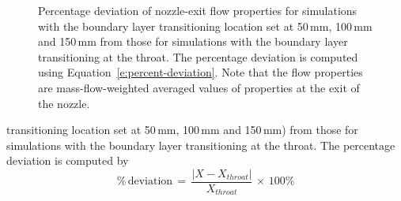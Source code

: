 \documentclass[12pt,a4paper]{article}
\begin{document}
\begin{figure}[htbp]
\begin{center}
{   \label{f:nozzle-exit-x-vel-quantify-effects-BL-trans}
  }
  \quad
  \caption{Percentage deviation of nozzle-exit flow properties for simulations 
           with the boundary layer transitioning location set at 50\,mm, 100\,mm 
           and 150\,mm from those for simulations with the boundary layer 
           transitioning at the throat. The percentage deviation is computed using
           Equation~\ref{e:percent-deviation}. Note that the flow properties are 
           mass-flow-weighted averaged values of properties at the exit of the nozzle.}
  \label{f:nozzle-exit-profiles-quantify-effects-BL-trans}
 \end{center}
\end{figure}
%
transitioning location set at 50\,mm, 100\,mm and 150\,mm) from those for simulations 
with the boundary layer transitioning at the throat. The percentage deviation is 
computed by 
%
\begin{equation}
 \% \, \mathrm{deviation} \, = \, \frac{|X - X_{throat}|}{X_{throat}} \, \times \, 100\%
 \label{e:percent-deviation}
\end{equation}
\end{document}

